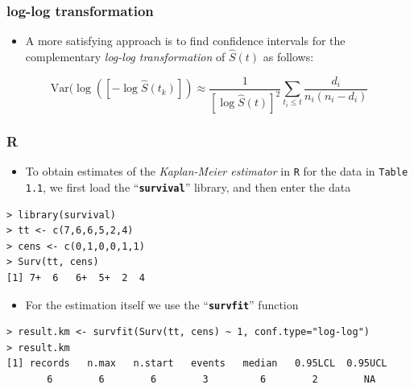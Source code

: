 \documentclass{beamer}
\newcommand{\empr}[1]{{\emph{\color{red}#1}}}
\newcommand{\pkg}[1]{{\textbf{\texttt{#1}}}}
\newcommand{\Var}{\mathrm{Var}}%
\begin{document}
\pagebreak
\begin{frame}
\frametitle{log-log transformation}
\begin{itemize}
\item A more satisfying approach is to find confidence intervals for the complementary \empr{log-log transformation} of $\hat{S}(t)$  as follows:
\end{itemize}
\begin{equation}
\Var(\log([-\log\hat{S}(t_k)])\approx \frac{1}{[\log\hat{S}(t)]^{2}}\sum\limits_{t_i\le t}^{} \frac{d_i}{n_i(n_i -d_i)}
\end{equation}
\end{frame}

\pagebreak
\begin{frame}[fragile]
\frametitle{R}
\begin{itemize}
\item To obtain estimates of the \empr{Kaplan-Meier estimator} in \texttt{R} for the data in \texttt{Table 1.1}, we first load the  ``\pkg{survival}'' library, and then enter the data
\end{itemize}

\begin{Verbatim}
> library(survival)
> tt <- c(7,6,6,5,2,4)
> cens <- c(0,1,0,0,1,1)
> Surv(tt, cens)
[1] 7+  6   6+  5+  2  4
\end{Verbatim}

\begin{itemize}
\item For the estimation itself we use the ``\pkg{survfit}'' function
\end{itemize}

\begin{Verbatim}
> result.km <- survfit(Surv(tt, cens) ~ 1, conf.type="log-log")
> result.km
[1] records   n.max   n.start   events   median   0.95LCL  0.95UCL 
       6        6        6        3         6        2        NA
\end{Verbatim}
\end{frame}
\end{document}
